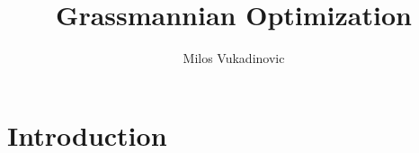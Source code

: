 \documentclass[11pt,a4paper]{report}
\author{Milos Vukadinovic}
\title{Grassmannian Optimization}
\begin{document}
\maketitle
\setcounter{tocdepth}{1}
\tableofcontents


      \chapter{Introduction}
      \cite{chatterjee_thesis}
 
 
 
 
 
 
 
 
 
 
 


 
 
\end{document}
